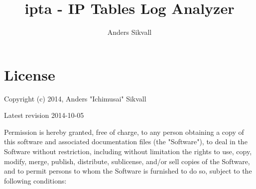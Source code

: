 \documentclass[10pt,a4paper]{report}
\author{Anders Sikvall}
\title{ipta - IP Tables Log Analyzer}
\begin{document}
\maketitle

\cleardoublepage

\tableofcontents

\chapter*{License}
\label{license}

Copyright (c) 2014, Anders "Ichimusai" Sikvall 

Latest revision 2014-10-05 
 
Permission is hereby granted, free of charge, to any person obtaining a copy of this software and associated documentation files (the "Software"), to deal in the Software without restriction, including without limitation the rights to use, copy, modify, merge, publish, distribute, sublicense, and/or sell copies of the Software, and to permit persons to whom the Software is furnished to do so, subject to the following conditions:  
\end{document}
